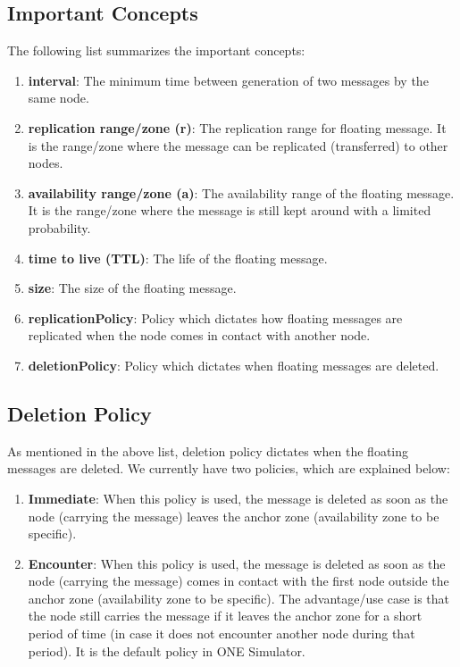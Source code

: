 \subsection{Important Concepts}
The following list summarizes the important concepts:
\begin{enumerate}
  \item \textbf{interval}: The minimum time between generation of two messages by the same node.
  \item \textbf{replication range/zone (r)}: The replication range for floating message. It is the range/zone where the message can be replicated (transferred) to other nodes.
  \item \textbf{availability range/zone (a)}: The availability range of the floating message. It is the range/zone where the message is still kept around with a limited probability.
  \item \textbf{time to live (TTL)}: The life of the floating message.
  \item \textbf{size}: The size of the floating message.
  \item \textbf{replicationPolicy}: Policy which dictates how floating messages are replicated when the node comes in contact with another node.
  \item \textbf{deletionPolicy}: Policy which dictates when floating messages are deleted.
\end{enumerate}

\subsection {Deletion Policy}
As mentioned in the above list, deletion policy dictates when the floating messages are deleted. We currently have two policies, which are explained below:
  \begin{enumerate}
    \item \textbf{Immediate}: When this policy is used, the message is deleted as soon as the node (carrying the message) leaves the anchor zone (availability zone to be specific).
    \item \textbf{Encounter}: When this policy is used, the message is deleted as soon as the node (carrying the message) comes in contact with the first node outside the anchor zone (availability zone to be specific). The advantage/use case is that the node still carries the message if it leaves the anchor zone for a short period of time (in case it does not encounter another node during that period). It is the default policy in ONE Simulator.
  \end{enumerate}

